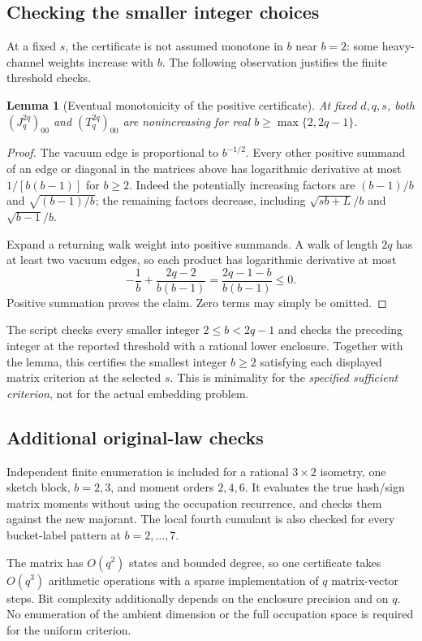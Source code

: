 \documentclass[11pt]{article}
\numberwithin{equation}{section}
\newtheorem{lemma}[theorem]{Lemma}
\theoremstyle{definition}\newtheorem{definition}[theorem]{Definition}
\theoremstyle{remark}\newtheorem{remark}[theorem]{Remark}
\begin{document}
\subsection{Checking the smaller integer choices}
At a fixed $s$, the certificate is not assumed monotone in $b$ near $b=2$: some heavy-channel weights increase with $b$. The following observation justifies the finite threshold checks.

\begin{lemma}[Eventual monotonicity of the positive certificate]
At fixed $d,q,s$, both $(J_q^{2q})_{00}$ and $(T_q^{2q})_{00}$ are nonincreasing for real $b\ge\max\{2,2q-1\}$.
\end{lemma}
\begin{proof}
The vacuum edge is proportional to $b^{-1/2}$. Every other positive summand of an edge or diagonal in the matrices above has logarithmic derivative at most $1/[b(b-1)]$ for $b\ge2$. Indeed the potentially increasing factors are $(b-1)/b$ and $\sqrt{(b-1)/b}$; the remaining factors decrease, including $\sqrt{sb+L}/b$ and $\sqrt{b-1}/b$.

Expand a returning walk weight into positive summands. A walk of length $2q$ has at least two vacuum edges, so each product has logarithmic derivative at most
\[
 -\frac1b+\frac{2q-2}{b(b-1)}
 =\frac{2q-1-b}{b(b-1)}\le0.
\]
Positive summation proves the claim. Zero terms may simply be omitted.
\end{proof}
The script checks every smaller integer $2\le b<2q-1$ and checks the preceding integer at the reported threshold with a rational lower enclosure. Together with the lemma, this certifies the smallest integer $b\ge2$ satisfying each displayed matrix criterion at the selected $s$. This is minimality for the \emph{specified sufficient criterion}, not for the actual embedding problem.

\subsection{Additional original-law checks}
Independent finite enumeration is included for a rational $3\times2$ isometry, one sketch block, $b=2,3$, and moment orders $2,4,6$. It evaluates the true hash/sign matrix moments without using the occupation recurrence, and checks them against the new majorant. The local fourth cumulant is also checked for every bucket-label pattern at $b=2,\ldots,7$.

The matrix has $O(q^2)$ states and bounded degree, so one certificate takes $O(q^3)$ arithmetic operations with a sparse implementation of $q$ matrix-vector steps. Bit complexity additionally depends on the enclosure precision and on $q$. No enumeration of the ambient dimension or the full occupation space is required for the uniform criterion.
\end{document}
